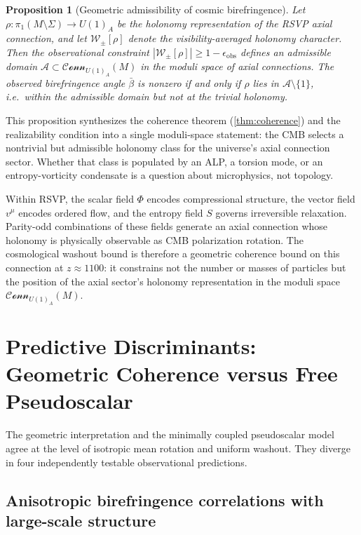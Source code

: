\documentclass[12pt]{article}
\newtheorem{proposition}[theorem]{Proposition}
\theoremstyle{definition}
\begin{document}
\begin{proposition}[Geometric admissibility of cosmic birefringence]
\label{prop:admissibility}
Let $\rho:\pi_1(M\setminus\Sigma)\to U(1)_A$ be the holonomy representation of the RSVP axial connection, and let $\mathcal{W}_\pm[\rho]$ denote the visibility-averaged holonomy character. Then the observational constraint $|\mathcal{W}_\pm[\rho]|\geq1-\epsilon_{\mathrm{obs}}$ defines an admissible domain $\mathcal{A}\subset\mathcal{Conn}_{U(1)_A}(M)$ in the moduli space of axial connections. The observed birefringence angle $\bar\beta$ is nonzero if and only if $\rho$ lies in $\mathcal{A}\setminus\{1\}$, i.e.\ within the admissible domain but not at the trivial holonomy.
\end{proposition}

\noindent This proposition synthesizes the coherence theorem (\cref{thm:coherence}) and the realizability condition into a single moduli-space statement: the CMB selects a nontrivial but admissible holonomy class for the universe's axial connection sector. Whether that class is populated by an ALP, a torsion mode, or an entropy-vorticity condensate is a question about microphysics, not topology.

Within RSVP, the scalar field $\Phi$ encodes compressional structure, the vector field $v^\mu$ encodes ordered flow, and the entropy field $S$ governs irreversible relaxation. Parity-odd combinations of these fields generate an axial connection whose holonomy is physically observable as CMB polarization rotation. The cosmological washout bound is therefore a geometric coherence bound on this connection at $z\approx1100$: it constrains not the number or masses of particles but the position of the axial sector's holonomy representation in the moduli space $\mathcal{Conn}_{U(1)_A}(M)$.

\section{Predictive Discriminants: Geometric Coherence versus Free Pseudoscalar}
\label{sec:discriminants}

The geometric interpretation and the minimally coupled pseudoscalar model
agree at the level of isotropic mean rotation and uniform washout.
They diverge in four independently testable observational predictions.

\subsection{Anisotropic birefringence correlations with large-scale structure}
\end{document}

